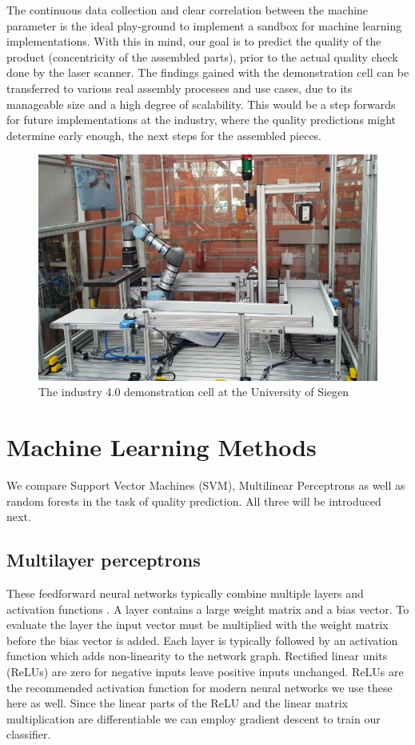 \documentclass[5p,times,procedia]{elsarticle}
\begin{document}
The continuous data collection and clear correlation between the machine parameter is the ideal play-ground to implement a sandbox for machine learning implementations. With this in mind, our goal is to predict the quality of the product (concentricity of the assembled parts), prior to the actual quality check done by the laser scanner. The findings gained with the demonstration cell can be transferred to various real assembly processes and use cases, due to its manageable size and a high degree of scalability. This would be a step forwards for future implementations at the industry, where the quality predictions might determine early enough, the next steps for the assembled pieces.


\begin{figure}
       \includegraphics[width=.45\textwidth]{img/demozelle}
       \caption{The industry 4.0 demonstration cell at the University of Siegen}
\label{fig:ind_cell}
\end{figure}

\section{Machine Learning Methods} %

We compare Support Vector Machines (SVM), Multilinear Perceptrons
\cite{bishop2006pattern} as well as random forests in the task of
quality prediction. All three will be introduced next.

\subsection{Multilayer perceptrons}
These feedforward neural networks typically combine multiple layers
and activation functions \cite{bishop2006pattern}.
A layer contains a large weight matrix and
a bias vector. To evaluate the layer the input vector must be
multiplied with the weight matrix before the bias vector is added.
Each layer is typically followed by an activation function 
which adds non-linearity to the network graph. Rectified linear units
(ReLUs) are zero for negative inputs leave positive inputs unchanged.
ReLUs are the recommended activation function for modern neural
networks \cite{goodfellow2016deep} we use these here as well.
Since the linear parts of the ReLU and the linear matrix multiplication
are differentiable we can employ gradient descent to train our 
classifier.
\end{document}
